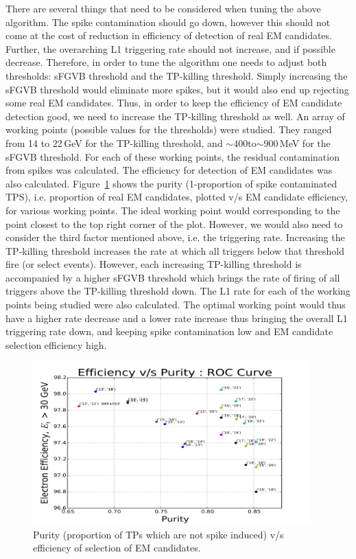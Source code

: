 There are several things that need to be considered when tuning the above algorithm. The spike contamination should go down, however this should not come at the cost of reduction in efficiency of detection of real EM candidates. Further, the overarching L1 triggering rate should not increase, and if possible decrease. Therefore, in order to tune the algorithm one needs to adjust both thresholds: sFGVB threshold and the TP-killing threshold. Simply increasing the sFGVB threshold would eliminate more spikes, but it would also end up rejecting some real EM candidates. Thus, in order to keep the efficiency of EM candidate detection good, we need to increase the TP-killing threshold as well. An array of working points (possible values for the thresholds) were studied. They ranged from 14 to 22\,GeV for the TP-killing threshold, and $\sim400$to$\sim900\,$MeV for the sFGVB threshold. For each of these working points, the residual contamination from spikes was calculated. The efficiency for detection of EM candidates was also calculated. Figure~\ref{fig:spikeroc} shows the purity (1-proportion of spike contaminated TPS), i.e. proportion of real EM candidates, plotted v/s EM candidate efficiency, for various working points. The ideal working point would corresponding to the point closest to the top right corner of the plot. However, we would also need to consider the third factor mentioned above, i.e. the triggering rate. Increasing the TP-killing threshold increases the rate at which all triggers below that threshold fire (or select events). However, each increasing TP-killing threshold is accompanied by a higher sFGVB threshold which brings the rate of firing of all triggers above the TP-killing threshold down. The L1 rate for each of the working points being studied were also calculated. The optimal working point would thus have a higher rate decrease and a lower rate increase thus bringing the overall L1 triggering rate down, and keeping spike contamination low and EM candidate selection efficiency high.

\begin{figure}
\begin{center}
  \includegraphics[width=0.95\textwidth,keepaspectratio]{plots_and_figures/chapter3/spikeroc.png}
\caption{Purity (proportion of TPs which are not spike induced) v/s efficiency of selection of EM candidates. }
\label{fig:spikeroc}
\end{center}
\end{figure}

